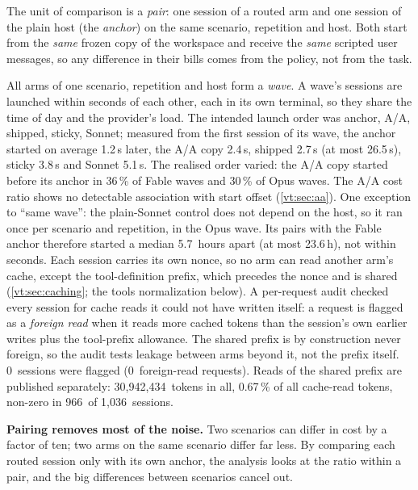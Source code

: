 \documentclass[11pt,letterpaper]{article}
\newcommand{\term}[1]{\emph{#1}}
\newcommand{\AuditFlagged}{0}
\newcommand{\NSessions}{1{,}036}
\newcommand{\RgCrossSessions}{966}
\newcommand{\RgCrossShare}{0.67}
\newcommand{\RgCrossTokens}{30{,}942{,}434}
\newcommand{\RgForeignRequests}{0}
\newcommand{\RvAAFirstFable}{36}
\newcommand{\RvAAFirstOpus}{30}
\newcommand{\RvSonnetWaveMaxH}{23.6}
\newcommand{\RvSonnetWaveMedianH}{5.7}
\newcommand{\StaggerAA}{2.4}
\newcommand{\StaggerAnchor}{1.2}
\newcommand{\StaggerShipped}{2.7}
\newcommand{\StaggerShippedMax}{26.5}
\newcommand{\StaggerSonnet}{5.1}
\newcommand{\StaggerSticky}{3.8}
\begin{document}
The unit of comparison is a \term{pair}: one session of a routed arm and one session of the plain host
(the \term{anchor}) on the same scenario, repetition and host. Both start from the \emph{same} frozen copy
of the workspace and receive the \emph{same} scripted user messages, so any difference in their bills
comes from the policy, not from the task.

All arms of one scenario, repetition and host form a \term{wave}. A wave's sessions are launched within
seconds of each other, each in its own terminal, so they share the time of day and the provider's load.
The intended launch order was anchor, A/A, shipped, sticky, Sonnet; measured from the first session of its wave,
the anchor started on average \StaggerAnchor\,s later, the A/A copy \StaggerAA\,s, shipped \StaggerShipped\,s (at
most \StaggerShippedMax\,s), sticky \StaggerSticky\,s and Sonnet \StaggerSonnet\,s. The realised order varied:
the A/A copy started before its anchor in \RvAAFirstFable\,\% of Fable waves and \RvAAFirstOpus\,\% of Opus waves.
The A/A cost ratio shows no detectable association with start offset (\cref{vt:sec:aa}). One exception to ``same wave'': the plain-Sonnet
control does not depend on the host, so it ran once per scenario and repetition, in the Opus wave. Its pairs with
the Fable anchor therefore started a median \RvSonnetWaveMedianH\ hours apart (at most \RvSonnetWaveMaxH\,h), not
within seconds. Each session carries its own
nonce, so no arm can read another arm's cache, except the tool-definition prefix, which precedes the nonce and is
shared (\cref{vt:sec:caching}; the tools normalization below). A per-request audit checked every
session for cache reads it could not have written itself: a request is flagged as a \term{foreign read} when it reads
more cached tokens than the session's own earlier writes plus the tool-prefix allowance. The shared prefix is by
construction never foreign, so the audit tests leakage between arms beyond it, not the prefix itself.
\AuditFlagged\ sessions were flagged (\RgForeignRequests\ foreign-read requests). Reads of the shared prefix are
published separately: \RgCrossTokens\ tokens in all, \RgCrossShare\,\% of all cache-read tokens, non-zero in
\RgCrossSessions\ of \NSessions\ sessions.

\begin{keyidea}
\textbf{Pairing removes most of the noise.} Two scenarios can differ in cost by a factor of ten; two arms on
the same scenario differ far less. By comparing each routed session only with its own anchor, the
analysis looks at the ratio within a pair, and the big differences between scenarios cancel out.
\end{keyidea}
\end{document}
